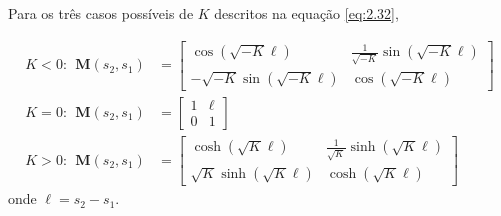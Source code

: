 Para os três casos possíveis de $K$ descritos na equação \eqref{eq:2.32},
	
\begin{align}
	K<0: \ \ \boldsymbol{M}(s_2,s_1) &= \begin{bmatrix}
	\cos(\sqrt{-K}\ell) & \frac{1}{\sqrt{-K}}\sin(\sqrt{-K}\ell)\\
	-\sqrt{-K}\sin(\sqrt{-K}\ell) & \cos(\sqrt{-K}\ell)
	\end{bmatrix}\\
	K=0: \ \ \boldsymbol{M}(s_2,s_1) &= \begin{bmatrix}
		1 & \ell\\
		0 & 1
		\end{bmatrix}\\
	K>0: \ \ \boldsymbol{M}(s_2,s_1) &= \begin{bmatrix}
		\cosh(\sqrt{K}\ell) & \frac{1}{\sqrt{K}}\sinh(\sqrt{K}\ell)\\
		\sqrt{K}\sinh(\sqrt{K}\ell) & \cosh(\sqrt{K}\ell)
		\end{bmatrix}
\end{align}
onde $\ell = s_2-s_1$.
	
